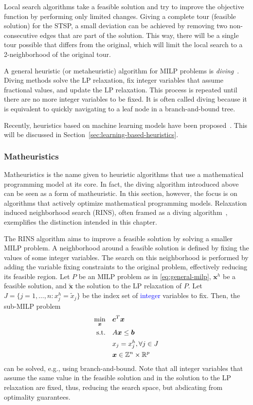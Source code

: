 Local search algorithms take a feasible solution and try to improve the objective function by performing only limited changes.
Giving a complete tour (feasible solution) for the STSP, a small deviation can be achieved by removing two non-consecutive edges that are part of the solution.
This way, there will be a single tour possible that differs from the original, which will limit the local search to a 2-neighborhood of the original tour.

A general heuristic (or metaheuristic) algorithm for MILP problems is \emph{diving}~\cite{fischettiHeuristicsMixedInteger2011}.
Diving methods solve the LP relaxation, fix integer variables that assume fractional values, and update the LP relaxation.
This process is repeated until there are no more integer variables to be fixed.
It is often called diving because it is equivalent to quickly navigating to a leaf node in a branch-and-bound tree.

Recently, heuristics based on machine learning models have been proposed~\cite{bengioMachineLearningCombinatorial2021}.
This will be discussed in Section~\ref{sec:learning-based-heuristics}.

\subsubsection{Matheuristics}

Matheuristics is the name given to heuristic algorithms that use a mathematical programming model at its core.
In fact, the diving algorithm introduced above can be seen as a form of matheuristic.
In this section, however, the focus is on algorithms that actively optimize mathematical programming models.
Relaxation induced neighborhood search (RINS), often framed as a diving algorithm~\cite{maniezzoMatheuristicsAlgorithmsImplementations2021}, exemplifies the distinction intended in this chapter.

The RINS algorithm aims to improve a feasible solution by solving a smaller MILP problem. 
A neighborhood around a feasible solution is defined by fixing the values of some integer variables.
The search on this neighborhood is performed by adding the variable fixing constraints to the original problem, effectively reducing its feasible region.
Let $P$ be an MILP problem as in \eqref{eq:general-milp}, $\bm{x}^{h}$ be a feasible solution, and $\widetilde{\bm{x}}$ the solution to the LP relaxation of $P$.
Let $J = \{j = 1,\ldots,n : x_j^{h} = \widetilde{x}_j\}$ be the index set of \textcolor{blue}{integer} variables to fix.
Then, the sub-MILP problem
\begin{align*}
    \min_{\bm{x}} \quad & \bm{c}^{T}\bm{x} \\
    \textrm{s.t.} \quad & A\bm{x}\le \bm{b} \\
      & x_j = x_j^{h}, \forall j \in J \\
      & \bm{x}\in \mathbb{Z}^{n}\times \mathbb{R}^{p}
\end{align*}
can be solved, e.g., using branch-and-bound.
Note that all integer variables that assume the same value in the feasible solution and in the solution to the LP relaxation are fixed, thus, reducing the search space, but abdicating from optimality guarantees.

